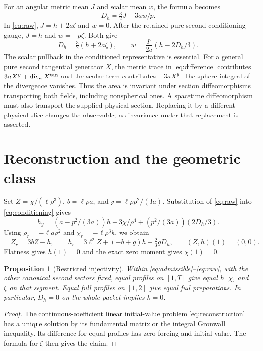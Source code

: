 \documentclass[11pt]{article}
\newtheorem{proposition}{Proposition}
\begin{document}
For an angular metric mean $J$ and scalar mean $w$, the formula becomes
\begin{equation}
 \boxed{D_h=\tfrac32J-3aw/p.}
 \label{eq:invariant}
\end{equation}
In \eqref{eq:raw}, $J=h+2a\zeta$ and $w=0$. After the retained pure
second conditioning gauge, $J=h$ and $w=-p\zeta$. Both give
\begin{equation}
 D_h=\tfrac32(h+2a\zeta),\qquad
 w=\frac{p}{2a}(h-2D_h/3).
 \label{eq:conditioning}
\end{equation}
The scalar pullback in the conditioned representative is essential.
For a general pure second tangential generator $X$, the metric trace in
\eqref{eq:difference} contributes $3aX^y+\operatorname{div}_\kappa X^{\rm tan}$
and the scalar term contributes $-3aX^y$. The sphere integral of the
divergence vanishes. Thus the area is invariant under section
diffeomorphisms transporting both fields, including nonspherical ones.
A spacetime diffeomorphism must also transport the supplied physical
section. Replacing it by a different physical slice changes the
observable; no invariance under that replacement is asserted.

\section{Reconstruction and the geometric class}

Set $Z=\chi/(\ell\rho^3)$, $b=\ell\rho a$, and
$g=\ell\rho p^2/(3a)$. Substitution of \eqref{eq:raw} into
\eqref{eq:conditioning} gives
\begin{equation}
 h_y=(a-p^2/(3a))h-3\chi/\rho^4+(p^2/(3a))(2D_h/3).
 \label{eq:hy}
\end{equation}
Using $\rho_r=-\ell a\rho^2$ and $\chi_r=-\ell\rho^3h$, we obtain
\begin{equation}
 \boxed{\quad Z_r=3bZ-h,\qquad
 h_r=3\ell^2Z+(-b+g)h-\tfrac23gD_h,\qquad
 (Z,h)(1)=(0,0).\quad}
 \label{eq:reconstruction}
\end{equation}
Flatness gives $h(1)=0$ and the exact zero moment gives $\chi(1)=0$.

\begin{proposition}[Restricted injectivity]\label{prop:injectivity}
Within \eqref{eq:admissible}--\eqref{eq:raw}, with the other canonical
second sectors fixed, equal profiles on $[1,T]$ give equal $h$, $\chi$,
and $\zeta$ on that segment. Equal full profiles on $[1,2]$ give equal
full preparations. In particular, $D_h=0$ on the whole packet implies
$h=0$.
\end{proposition}
\begin{proof}
The continuous-coefficient linear initial-value problem
\eqref{eq:reconstruction} has a unique solution by its fundamental matrix
or the integral Gronwall inequality. Its difference for equal profiles
has zero forcing and initial value. The formula for $\zeta$ then gives
the claim.
\end{proof}
\end{document}

